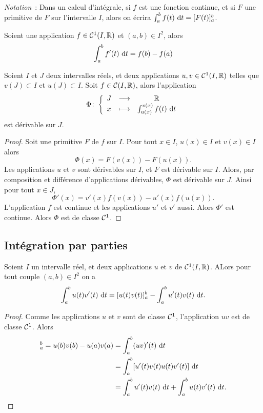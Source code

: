 \emph{Notation}~: Dans un calcul d'intégrale, si $f$ est une fonction continue,  et si $F$ une primitive de $F$ sur l'intervalle $I$, alors on écrira $\int_a^b f(t)\,\mathop{}\mathopen{}\mathrm{d} t=[F(t)]_a^b$.

\begin{corth}
  Soient une application $f \in \mathcal{C}^{1}(I,\mathbb{R})$ et $(a,b) \in I^2$, alors
  \begin{equation}
    \int_a^b f'(t)\,\mathop{}\mathopen{}\mathrm{d} t=f(b)-f(a)
  \end{equation}
\end{corth}

\begin{prop}
  Soient $I$ et $J$ deux intervalles réels, et deux applications $u,v \in \mathcal{C}^{1}(I,\mathbb{R})$ telles que $v(J) \subset I$ et $u(J) \subset I$. Soit $f \in \mathcal{C}(I,\mathbb{R})$, alors l'application
  \begin{equation}
    \Phi\colon \left\{\begin{array}{ccc} J & \longrightarrow &\mathbb{R}\\ x & \longmapsto & \int_{u(x)}^{v(x)}f(t)\,\mathop{}\mathopen{}\mathrm{d} t \end{array} \right.
  \end{equation}
  est dérivable sur $J$.
\end{prop}
\begin{proof}
  Soit une primitive $F$ de $f$ sur $I$. Pour tout $x \in I$, $u(x) \in I$ et $v(x) \in I$ alors
  \begin{equation}
    \Phi(x) = F(v(x))-F(u(x)).
  \end{equation}
  Les applications $u$ et $v$ sont dérivables sur $I$, et $F$ est dérivable sur $I$. Alors, par composition et différence d'applications dérivables, $\Phi$ est dérivable sur $J$. Ainsi pour tout $x \in J$,
  \begin{equation}
    \Phi'(x) = v'(x)f(v(x)) -u'(x)f(u(x)).
  \end{equation}
  L'application $f$ est continue et les applications $u'$ et $v'$ aussi. Alors $\Phi'$ est continue. Alors $\Phi$ est de classe $\mathcal{C}^{1}$.
\end{proof}

\subsection{Intégration par parties}

\begin{theo}
  Soient $I$ un intervalle réel, et deux applications $u$ et $v$ de $\mathcal{C}^{1}(I,\mathbb{R})$. ALors pour tout couple $(a,b) \in I^2$ on a
  \begin{equation}
    \int_a^b u(t)v'(t)\,\mathop{}\mathopen{}\mathrm{d} t = [u(t)v(t)]_a^b - \int_a^b u'(t)v(t)\,\mathop{}\mathopen{}\mathrm{d} t.
  \end{equation}
\end{theo}
\begin{proof}
  Comme les applications $u$ et $v$ sont de classe $\mathcal{C}^{1}$, l'application $uv$ est de classe $\mathcal{C}^{1}$. Alors
  \begin{align}
    [u(t)v(t)]_a^b = u(b)v(b)-u(a)v(a) &=\int_a^b (uv)'(t)\,\diff t \\
    &=\int_a^b[u'(t)v(t)u(t)v'(t)]\,\diff t \\
    &=\int_a^b u'(t)v(t)\,\diff t + \int_a^b u(t)v'(t)\,\diff t.
  \end{align}
\end{proof}


